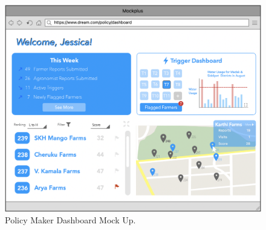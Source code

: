\begin{multicols}{3}
\begin{figure}[H]
\centering
\includegraphics[scale=0.392]{../images_diagrams/mock_ups/policydash100.png}
\caption{\label{fig:mock_polish}Policy Maker Dashboard Mock Up.}
\end{figure}


\end{multicols}



